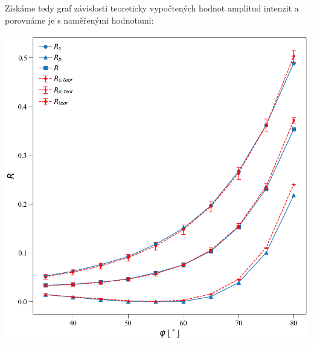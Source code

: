 \documentclass[a4paper,11pt]{article}
\begin{document}
    \begin{minipage}[t]{0.5\textwidth} 
                Získáme tedy graf závislosti teoreticky vypočtených hodnot amplitud intenzit a porovnáme je s naměřenými hodnotami: 
                \par \centering
                \vspace{10pt}
                \includegraphics[scale=0.3]{amplituda_2}
                \captionsetup{justification=centering, font=footnotesize}
                \label{fig:amplituda_2}
                \raggedright
                \vspace{10pt}

\end{minipage}
\end{document}
